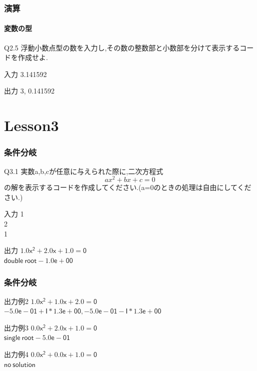 \documentclass[dvipdfmx]{beamer}
\begin{document}
\begin{frame}
    \frametitle{演算}
    \framesubtitle{変数の型}
	\begin{itembox}[l]{Q2.5}
        浮動小数点型の数を入力し,その数の整数部と小数部を分けて表示するコードを作成せよ.
	\end{itembox}
	\begin{block}{入力}
        3.141592
	\end{block}
	\begin{block}{出力}
        3, 0.141592
	\end{block}
\end{frame}

\section{Lesson3}
\begin{frame}
	\frametitle{条件分岐}
	\begin{itembox}[l]{Q3.1}
		実数a,b,cが任意に与えられた際に,二次方程式
		$$ax^2+bx+c=0$$
		の解を表示するコードを作成してください.(a=0のときの処理は自由にしてください.)
	\end{itembox}
	\begin{block}{入力}
    1\\
    2\\
    1
	\end{block}
	\begin{block}{出力}
		$\mathsf{1.0x^2 + 2.0x + 1.0 = 0}$\\
		$\mathsf{double \ root -1.0e+00}$
	\end{block}
\end{frame}

\begin{frame}
	\frametitle{条件分岐}
	\begin{block}{出力例2}
		$\mathsf{1.0x^2 + 1.0x + 2.0 = 0}$\\
		$\mathsf{-5.0e-01 + I * 1.3e+00, -5.0e-01 - I * 1.3e+00}$
	\end{block}
	\begin{block}{出力例3}
	$\mathsf{0.0x^2 + 2.0x + 1.0 = 0}$\\
	$\mathsf{single \ root -5.0e-01}$
	\end{block}
	\begin{block}{出力例4}
		$\mathsf{0.0x^2 + 0.0x + 1.0 = 0}$\\
		$\mathsf{no\ solution}$
	\end{block}
\end{frame}
\end{document}
